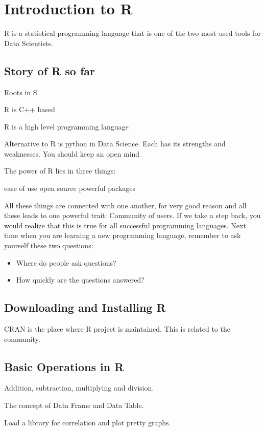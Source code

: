 \section{Introduction to R}

R is a statistical programming language that is one of the two most used tools for Data Scientists.  

\subsection{Story of R so far}

Roots in S 

R is C++ based 

R is a high level programming language 

Alternative to R is python in Data Science.  Each has its strengths and weaknesses.  You should keep an open mind 

The power of R lies in three things:

ease of use 
open source 
powerful packages


All these things are connected with one another, for very good reason and all these leads to one powerful trait: Community of users.  If we take a step back, you would realize that this is true for all successful programming languages.  Next time when you are learning a new programming language, remember to ask yourself these two questions:

\begin{itemize}
\item Where do people ask questions?
\item How quickly are the questions answered?
\end{itemize}

\subsection{Downloading and Installing R}

CRAN is the place where R project is maintained.  This is related to the community.  

\subsection{Basic Operations in R}

Addition, subtraction, multiplying and division.  

The concept of Data Frame and Data Table.  

Load a library for correlation and plot pretty graphs.  


